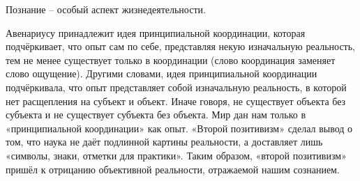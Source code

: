 \documentclass[exam_answers.tex]{subfiles}
\begin{document}
Познание – особый аспект жизнедеятельности.

Авенариусу принадлежит идея принципиальной координации, которая подчёркивает, что опыт сам по себе, представляя некую изначальную реальность, тем не менее существует только в координации (слово координация заменяет слово ощущение).
Другими словами, идея принципиальной координации подчёркивала, что опыт представляет собой изначальную реальность, в которой нет расщепления на субъект и объект.
Иначе говоря, не существует объекта без субъекта и не существует субъекта без объекта.
Мир дан нам только в «принципиальной координации» как опыт.
«Второй позитивизм» сделал вывод о том, что наука не даёт подлинной картины реальности, а доставляет лишь «символы, знаки, отметки для практики».
Таким образом, «второй позитивизм» пришёл к отрицанию объективной реальности, отражаемой нашим сознанием.
\end{document}
